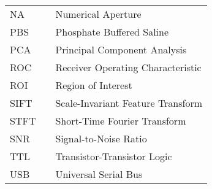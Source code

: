 \begin{center}
\begin{tabular}{lll}
    NA   & \dotfill & Numerical Aperture \\
    PBS  & \dotfill & Phosphate Buffered Saline \\
    PCA  & \dotfill & Principal Component Analysis \\
    ROC  & \dotfill & Receiver Operating Characteristic \\
    ROI  & \dotfill & Region of Interest \\
    SIFT & \dotfill & Scale-Invariant Feature Transform \\
    STFT & \dotfill & Short-Time Fourier Transform \\
    SNR  & \dotfill & Signal-to-Noise Ratio \\
    TTL  & \dotfill & Transistor-Transistor Logic \\
    USB  & \dotfill & Universal Serial Bus \\
  \end{tabular}
\end{center}
\cleardoublepage


\newpage
\endofprelim
